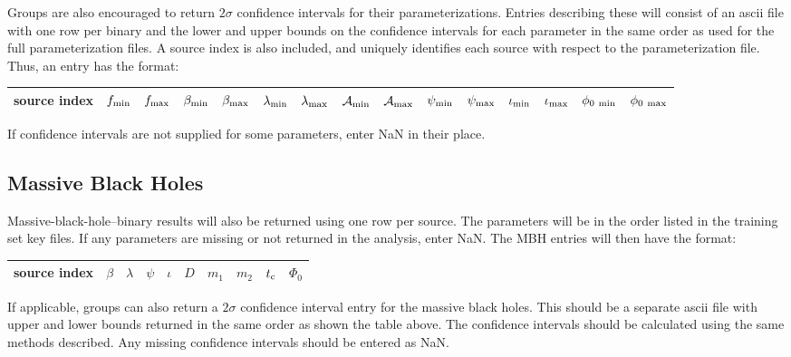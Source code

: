\documentclass[11pt]{article}
\begin{document}
Groups are also encouraged to return $2\sigma$ confidence intervals for their parameterizations. Entries describing these will consist of an ascii file with one row per binary and the lower and upper bounds on the confidence intervals for each parameter in the same order as used for the full parameterization files. A source index is also included, and uniquely identifies each source with respect to the parameterization file. Thus, an entry has the format:
\begin{center}
	\footnotesize
	\begin{tabular}{ccccccccccccccc}
	\hline
	source index & $f_{\rm min}$ & $f_{\rm max}$ & $\beta_{\rm min}$ & $\beta_{\rm max}$ & $\lambda_{\rm min}$ & $\lambda_{\rm max}$ & $\mathcal{A}_{\rm min}$ & $\mathcal{A}_{\rm max}$ & $\psi_{\rm min}$ & $\psi_{\rm max}$ & $\iota_{\rm min}$ & $\iota_{\rm max}$ & $\phi_{0~{\rm min}}$ & $\phi_{0~{\rm max}}$ \\
	\hline
	\end{tabular}
	\label{galacticconfidence}
\end{center}
If confidence intervals are not supplied for some parameters, enter NaN in their place.

\subsection{Massive Black Holes}
Massive-black-hole--binary results will also be returned using one row per source. The parameters will be in the order listed in the training set key files. If any parameters are missing or not returned in the analysis, enter NaN. The MBH entries will then have the format:
\begin{center}
	\begin{tabular}{cccccccccc}
		\hline
		source index & $\beta$ & $\lambda$ & $\psi$ & $\iota$ & $D$ & $m_1$ & $m_2$ & $t_{\rm c}$ & $\Phi_0$ \\
		\hline
	\end{tabular}
	\label{mbhentries}
\end{center}

If applicable, groups can also return a $2\sigma$ confidence interval entry for the massive black holes. This should be a separate ascii file with upper and lower bounds returned in the same order as shown the table above. The confidence intervals should be calculated using the same methods described. Any missing confidence intervals should be entered as NaN.
\end{document}
